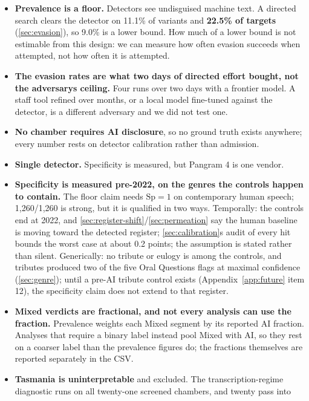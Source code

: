 \begin{itemize}
\tightlist
\item
  \textbf{Prevalence is a floor.} Detectors see undisguised machine text. A
  directed search clears the detector on 11.1\% of variants and \textbf{22.5\% of
  targets} (\cref{sec:evasion}), so 9.0\% is a lower bound. How much of a lower bound is
  not estimable from this design: we can measure how often evasion succeeds
  when attempted, not how often it is attempted.
\item
  \textbf{The evasion rates are what two days of directed effort bought, not the
  adversary\textquotesingle s ceiling.} Four runs over two days with a frontier model. A staff
  tool refined over months, or a local model fine-tuned against the detector,
  is a different adversary and we did not test one.
\item
  \textbf{No chamber requires AI disclosure}, so no ground truth exists anywhere;
  every number rests on detector calibration rather than admission.
\item
  \textbf{Single detector.} Specificity is measured, but Pangram 4 is one vendor.
\item
  \textbf{Specificity is measured pre-2022, on the genres the controls happen to
  contain.} The floor claim needs \(\mathrm{Sp} = 1\) on contemporary human speech;
  1,260/1,260 is strong, but it is qualified in two ways. Temporally: the
  controls end at 2022, and \cref{sec:register-shift}/\cref{sec:permeation} say the human baseline is moving toward
  the detected register; \cref{sec:calibration}\textquotesingle s audit of every hit bounds the worst case at
  about 0.2 points; the assumption is stated rather than silent. Generically:
  no tribute or eulogy is among the controls, and tributes produced two of the
  five Oral Questions flags at maximal confidence (\cref{sec:genre}); until a pre-AI
  tribute control exists (Appendix~\ref{app:future} item 12), the specificity claim does not
  extend to that register.
\item
  \textbf{Mixed verdicts are fractional, and not every analysis can use the fraction.} Prevalence weights each Mixed segment by its reported AI fraction. Analyses that require a binary label instead pool Mixed with AI, so they rest on a coarser label than the prevalence figures do; the fractions themselves are reported separately in the CSV.
\item
  \textbf{Tasmania is uninterpretable} and excluded. The transcription-regime
  diagnostic runs on all twenty-one screened chambers, and twenty pass into

\end{itemize}
